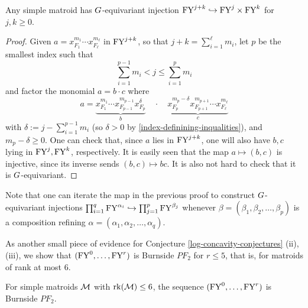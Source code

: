 \begin{prop}
\label{thm:2by2kos}
Any simple matroid has $G$-equivariant injection 
$
\mathrm{FY}^{j+k} \hookrightarrow \mathrm{FY}^j \times \mathrm{FY}^k
$
for $j,k \geq 0$.
\end{prop}
\begin{proof}
Given $a=x_{F_1}^{m_1} \cdots x_{F_\ell}^{m_\ell}$ in $\mathrm{FY}^{j+k}$, so that $j+k=\sum_{i=1}^\ell m_i$, let $p$ be the smallest 
index such that
\begin{equation}
\label{index-definining-inqualities}
\sum_{i=1}^{p-1} m_i < j \leq \sum_{i=1}^{p} m_i
\end{equation}
and factor the monomial $a=b \cdot c$ where
$$
a= \underbrace{x_{F_1}^{m_1} \cdots x_{F_{p-1}}^{m_{p-1}} x_{F_p}^\delta}_{b}
\quad \cdot \quad 
\underbrace{ x_{F_p}^{m_p-\delta} x_{F_{p+1}}^{m_{p+1}}  \cdots x_{F_\ell}^{m_\ell}}_{c}
$$
with 
$\delta:=j-\sum_{i=1}^{p-1}m_i$ 
(so $\delta > 0$ by \eqref{index-definining-inqualities}), and
$m_p-\delta \geq 0$.  One can check that, since $a$ lies in $\mathrm{FY}^{j+k}$,
one will also have $b, c$ lying in $\mathrm{FY}^j, \mathrm{FY}^k$, respectively.
It is easily seen that the map $a \longmapsto (b,c)$ is injective,
since its inverse sends $(b,c) \longmapsto bc$. It is also not
hard to check that it is $G$-equivariant.\qedhere
\end{proof}



\begin{remark} \rm
Note that one can iterate the map in the previous proof to construct $G$-equivariant 
injections 
$
\prod_{i=1}^q \mathrm{FY}^{\alpha_i} \hookrightarrow \prod_{j=1}^p \mathrm{FY}^{\beta_j}
$
whenever $\beta = (\beta_1, \beta_2, \ldots, \beta_p)$ is a composition refining $\alpha = (\alpha_1, \alpha_2, \ldots, \alpha_q).$ 
\end{remark}

As another small piece of evidence for Conjecture \ref{log-concavity-conjectures} (ii), (iii), we show that $(\mathrm{FY}^0, \ldots, \mathrm{FY}^r)$ is Burnside $PF_2$ for $r \leq 5$, that is, for matroids of rank at most $6$.


\begin{prop} \label{thm:small-burnside-pf2}
For simple matroids $\mathcal{M}$ with $\operatorname{\mathrm{rk}}(\mathcal{M}) \leq 6$, the sequence $(\mathrm{FY}^0, \ldots, \mathrm{FY}^r)$ is Burnside $PF_2$.
\end{prop}

